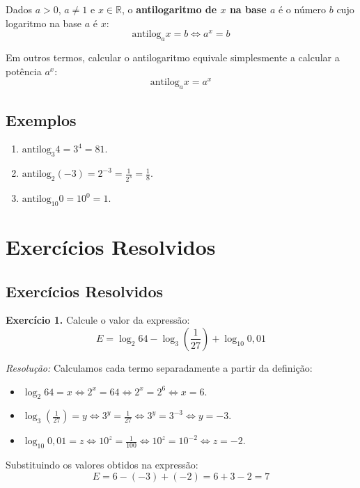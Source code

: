 \documentclass[12pt,a4paper]{report}
\begin{document}
	\begin{destaque}
		Dados $a > 0$, $a \neq 1$ e $x \in \mathbb{R}$, o \textbf{antilogaritmo de $x$ na base $a$} é o número $b$ cujo logaritmo na base $a$ é $x$:
		$$\text{antilog}_a x = b \iff a^x = b$$
	\end{destaque}
	
	Em outros termos, calcular o antilogaritmo equivale simplesmente a calcular a potência $a^x$:
	$$\text{antilog}_a x = a^x$$
	
	\subsection*{Exemplos}
	
	\begin{enumerate}[label=\textbf{\alph*)}]
		\item $\text{antilog}_3 4 = 3^4 = 81$.
		\item $\text{antilog}_2 (-3) = 2^{-3} = \frac{1}{2^3} = \frac{1}{8}$.
		\item $\text{antilog}_{10} 0 = 10^0 = 1$.
	\end{enumerate}
	
	\section{Exercícios Resolvidos}
	
	\subsection*{Exercícios Resolvidos}
	
	\textbf{Exercício 1.} Calcule o valor da expressão:
	$$E = \log_2 64 - \log_3 \left(\frac{1}{27}\right) + \log_{10} 0{,}01$$
	
	\textit{Resolução:}
	Calculamos cada termo separadamente a partir da definição:
	\begin{itemize}[label=$\circ$]
		\item $\log_2 64 = x \iff 2^x = 64 \iff 2^x = 2^6 \iff x = 6$.
		\item $\log_3 \left(\frac{1}{27}\right) = y \iff 3^y = \frac{1}{27} \iff 3^y = 3^{-3} \iff y = -3$.
		\item $\log_{10} 0{,}01 = z \iff 10^z = \frac{1}{100} \iff 10^z = 10^{-2} \iff z = -2$.
	\end{itemize}
	Substituindo os valores obtidos na expressão:
	$$E = 6 - (-3) + (-2) = 6 + 3 - 2 = 7$$
	
	\vspace{0.3cm}
	
\end{document}
